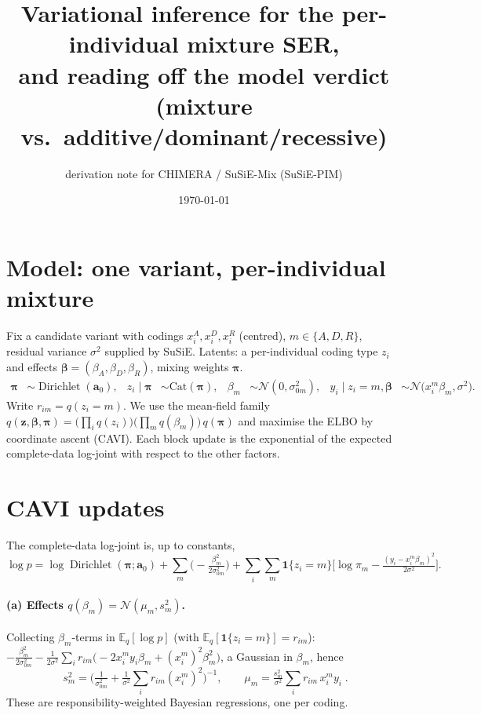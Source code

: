 \documentclass[11pt]{article}
\title{Variational inference for the per-individual mixture SER,\\
and reading off the model verdict (mixture vs.\ additive/dominant/recessive)}
\author{derivation note for CHIMERA / SuSiE-Mix (SuSiE-PIM)}
\date{\today}
\newcommand{\E}{\mathbb{E}}
\newcommand{\N}{\mathcal{N}}
\newcommand{\rim}{r_{im}}
\DeclareMathOperator{\Dir}{Dirichlet}
\begin{document}
\maketitle

\section{Model: one variant, per-individual mixture}
Fix a candidate variant with codings $x_i^A,x_i^D,x_i^R$ (centred), $m\in\{A,D,R\}$,
residual variance $\sigma^2$ supplied by SuSiE. Latents: a per-individual coding
type $z_i$ and effects $\bm\beta=(\beta_A,\beta_D,\beta_R)$, mixing weights
$\bm\pi$.
\begin{align}
\bm\pi&\sim\Dir(\bm a_0), &
z_i\mid\bm\pi&\sim\mathrm{Cat}(\bm\pi), &
\beta_m&\sim\N(0,\sigma_{0m}^2), &
y_i\mid z_i{=}m,\bm\beta&\sim\N\!\big(x_i^m\beta_m,\sigma^2\big).
\label{eq:model}
\end{align}
Write $\rim=q(z_i{=}m)$. We use the mean-field family
$q(\bm z,\bm\beta,\bm\pi)=\big(\prod_i q(z_i)\big)\big(\prod_m q(\beta_m)\big)\,q(\bm\pi)$
and maximise the ELBO by coordinate ascent (CAVI). Each block update is the
exponential of the expected complete-data log-joint with respect to the other
factors.

\section{CAVI updates}
The complete-data log-joint is, up to constants,
\begin{equation}
\log p=\log\Dir(\bm\pi;\bm a_0)+\sum_m\Big(\!-\tfrac{\beta_m^2}{2\sigma_{0m}^2}\Big)
+\sum_i\sum_m \mathbf 1\{z_i{=}m\}\Big[\log\pi_m-\tfrac{(y_i-x_i^m\beta_m)^2}{2\sigma^2}\Big].
\end{equation}

\paragraph{(a) Effects $q(\beta_m)=\N(\mu_m,s_m^2)$.}
Collecting $\beta_m$-terms in $\E_q[\log p]$ (with $\E_q[\mathbf 1\{z_i{=}m\}]=\rim$):
$-\tfrac{\beta_m^2}{2\sigma_{0m}^2}-\tfrac1{2\sigma^2}\sum_i \rim\big(\!-2x_i^m y_i\beta_m+(x_i^m)^2\beta_m^2\big)$,
a Gaussian in $\beta_m$, hence
\begin{equation}
\boxed{\;s_m^2=\Big(\tfrac1{\sigma_{0m}^2}+\tfrac1{\sigma^2}\textstyle\sum_i \rim (x_i^m)^2\Big)^{-1},
\qquad
\mu_m=\tfrac{s_m^2}{\sigma^2}\textstyle\sum_i \rim\, x_i^m y_i\; }.
\label{eq:beta}
\end{equation}
These are responsibility-weighted Bayesian regressions, one per coding.
\end{document}
